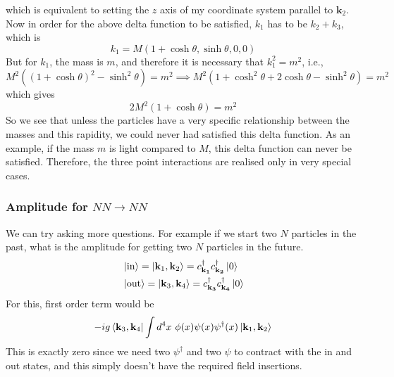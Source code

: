 \documentclass[11pt, notitlepage]{report}
\newcommand{\cdag}[1]{c^\dagger_\mathbf{#1}}
\numberwithin{equation}{section}
\begin{document}
    which is equivalent to setting the \(z\) axis of my coordinate system parallel to \(\textbf{k}_2\). \\
    Now in order for the above delta function to be satisfied, \(k_1\) has to be \(k_2 + k_3\), which is  
    \begin{equation*}
        k_1 = M(1+\cosh\theta, \sinh\theta, 0, 0)
    \end{equation*}
    But for \(k_1\), the mass is \(m\), and therefore it is necessary that \(k_1^2 = m^2\), i.e.,
    \begin{equation*}
        M^2((1+\cosh\theta)^2 - \sinh^2\theta) = m^2 \implies M^2(1 + \cosh^2\theta + 2\cosh\theta - \sinh^2\theta) = m^2
    \end{equation*}
    which gives 
    \begin{equation*}
        2M^2(1+\cosh\theta) = m^2
    \end{equation*}
    So we see that unless the particles have a very specific relationship between the masses and this rapidity, we could never had satisfied this delta function. As an example, if the mass \(m\) is light compared to \(M\), this delta function can never be satisfied. Therefore, the three point interactions are realised only in very special cases.
    
    \subsubsection{Amplitude for \(NN\to NN\)}

    We can try asking more questions. For example if we start two \(N\) particles in the past, what is the amplitude for getting two \(N\) particles in the future. 
    \begin{align*}
        &\ket{\text{in}} = \ket{\textbf{k}_1, \textbf{k}_2} = \cdag{k_1}\cdag{k_2}\ket{0}\\
        &\ket{\text{out}} = \ket{\textbf{k}_3, \textbf{k}_4} = \cdag{k_3}\cdag{k_4}\ket{0}\\
    \end{align*}
    For this, first order term would be 
    \begin{equation*}
        -ig\bra{\textbf{k}_3, \textbf{k}_4}\int d^4 x ~ \phi(x) \psi(x) \psi^\dagger(x) \ket{\textbf{k}_1, \textbf{k}_2}
    \end{equation*}
    This is exactly zero since we need two \(\psi^\dagger\) and two \(\psi\) to contract with the in and out states, and this simply doesn't have the required field insertions. \\
\end{document}
